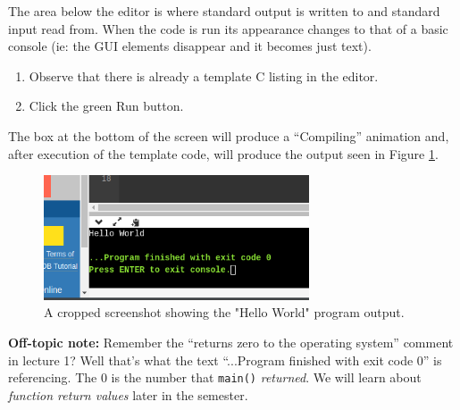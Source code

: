 \documentclass{lab}
\begin{document}
The area below the editor is where standard output is written to and standard input read from. When the code is run its appearance changes to that of a basic console (ie: the GUI elements disappear and it becomes just text).

\begin{task}{}{}
\begin{enumerate}
\item Observe that there is already a template C listing in the editor.
\item Click the green Run button.
\end{enumerate}
The box at the bottom of the screen will produce a ``Compiling'' animation and, after execution of the template code, will produce the output seen in Figure \ref{fig:onlinegdb_hello}.
\end{task}

\begin{figure}[H]
\begin{center}
\includegraphics[width=0.7\textwidth]{Wk1Images/onlinegdb_hello.png}
\end{center}
\caption{A cropped screenshot showing the "Hello World" program output.}\label{fig:onlinegdb_hello}
\end{figure}

\textbf{Off-topic note:} Remember the ``returns zero to the operating system'' comment in lecture 1? Well that's what the text ``...Program finished with exit code 0'' is referencing. The 0 is the number that \texttt{main()} \textit{returned}. We will learn about \textit{function return values} later in the semester.
\end{document}

